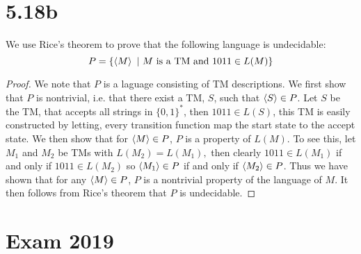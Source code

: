 \documentclass[a4paper,11pt]{article}
\numberwithin{equation}{section}
\begin{document}
\section*{5.18b}
We use Rice's theorem to prove that the following language is undecidable: \begin{equation*}
P=\{\braket{M}\ \vert\ M\text{ is a TM and } 1011\in L(M)  \}
\end{equation*}
\begin{proof}
We note that $ P $ is a laguage consisting of TM descriptions. We first show that $ P $ is nontrivial, i.e. that there exist a TM, $ S $, such that $ \braket{S}\in P $. Let $ S $ be the TM, that accepts all strings in $ \{0,1\}^* $, then $ 1011\in L(S) $, this TM is easily constructed by letting, every transition function map the start state to the accept state.
We then show that for $ \braket{M}\in P $, $ P $ is a property of $ L(M) $. To see this, let $ M_1 $ and $M_2 $ be TMs with $ L(M_2)=L(M_1), $ then clearly $ 1011\in L(M_1)$ if and only if $1011\in L(M_2) $ so $ \braket{M_1}\in P $ if and only if $ \braket{M_2}\in P $. Thus we have shown that for any $ \braket{M}\in P $, $ P $ is a nontrivial property of the language of $ M $. It then follows from Rice's theorem that $ P $ is undecidable.
\end{proof}

\section*{Exam 2019}
\end{document}
